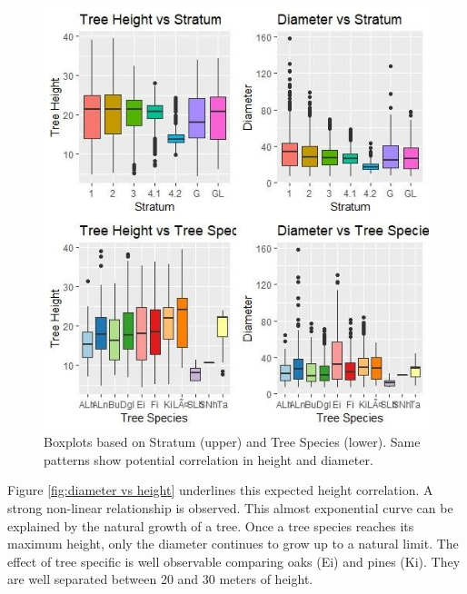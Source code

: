 \begin{figure}[H]
\centering
  \includegraphics[scale = 0.8]{boxplots_overview.jpg}
  \caption{Boxplots based on Stratum (upper) and Tree Species (lower). Same patterns show potential correlation in height and diameter.}
  \label{fig:boxplots Overview}
\end{figure}

Figure \ref{fig:diameter vs height} underlines this expected height correlation. A strong non-linear relationship is observed. This almost
exponential curve can be explained by the natural growth of a tree. Once a tree species reaches its maximum
height, only the diameter continues to grow up to a natural limit. The effect of tree specific is well observable
comparing oaks (Ei) and pines (Ki). They are well separated between 20 and 30 meters of height.

